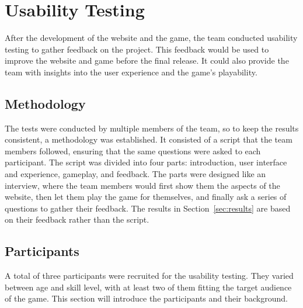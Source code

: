 \chapter{Usability Testing}\label{ch:user-test}

After the development of the website and the game,
the team conducted usability testing to gather feedback on the project.
This feedback would be used to improve the website and game before the final release.
It could also provide the team with insights into the user experience and the game's playability.

\section{Methodology}\label{sec:methodology}

The tests were conducted by multiple members of the team, so to keep the results consistent, a methodology was
established.
It consisted of a script that the team members followed, ensuring that the same questions were asked to each
participant.
The script was divided into four parts: introduction, user interface and experience, gameplay, and feedback.
The parts were designed like an interview, where the team members would first show them the aspects of the website,
then let them play the game for themselves, and finally ask a series of questions to gather their feedback.
The results in Section~\ref{sec:results} are based on their feedback rather than the script.

\section{Participants}\label{sec:participants}

A total of three participants were recruited for the usability testing.
They varied between age and skill level, with at least two of them fitting the target audience of the game.
This section will introduce the participants and their background.

